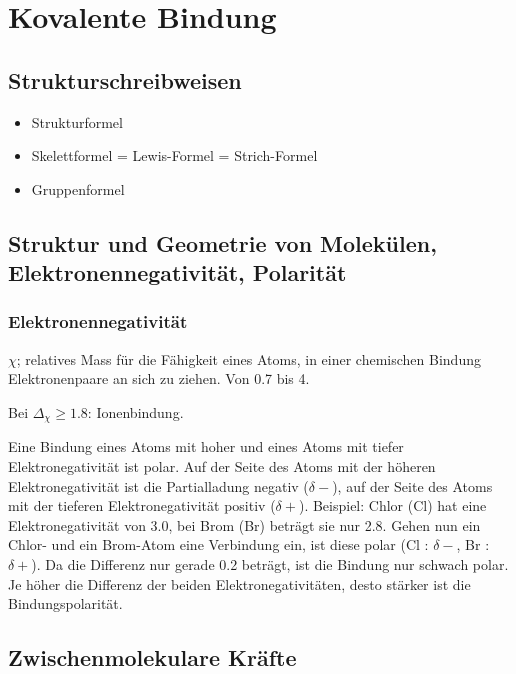 \section{Kovalente Bindung}

\subsection{Strukturschreibweisen}

\begin{itemize}
	\item Strukturformel
	\item Skelettformel = Lewis-Formel = Strich-Formel
	\item Gruppenformel
\end{itemize}

\subsection{Struktur und Geometrie von Molekülen, Elektronennegativität, Polarität}

\subsubsection{Elektronennegativität}

\begin{definition}[Elektronennegativität]
	$\chi$; relatives Mass für die Fähigkeit eines Atoms, in einer chemischen Bindung Elektronenpaare an sich zu ziehen. Von 0.7 bis 4.
\end{definition}

Bei $\Delta_\chi \geqslant 1.8$: Ionenbindung.

\begin{definition}[Bindungspolarität]
	Eine Bindung eines Atoms mit hoher und eines Atoms mit tiefer Elektronegativität ist
	polar. Auf der Seite des Atoms mit der höheren Elektronegativität ist die Partialladung
	negativ ($\delta -$), auf der Seite des Atoms mit der tieferen Elektronegativität positiv ($\delta +$).
	Beispiel: Chlor (Cl) hat eine Elektronegativität von 3.0, bei Brom (Br) beträgt sie nur
	2.8. Gehen nun ein Chlor- und ein Brom-Atom eine Verbindung ein, ist diese polar (Cl :
	$\delta -$, Br : $\delta +$). Da die Differenz nur gerade 0.2 beträgt, ist die Bindung nur schwach polar.
	Je höher die Differenz der beiden Elektronegativitäten, desto stärker ist die Bindungspolarität.
\end{definition}

\subsection{Zwischenmolekulare Kräfte}

